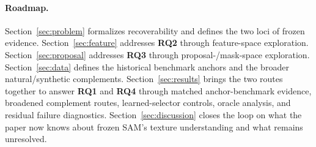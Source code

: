 \paragraph{Roadmap.} Section~\ref{sec:problem} formalizes recoverability and defines the two loci of frozen evidence. Section~\ref{sec:feature} addresses \textbf{RQ2} through feature-space exploration. Section~\ref{sec:proposal} addresses \textbf{RQ3} through proposal-/mask-space exploration. Section~\ref{sec:data} defines the historical benchmark anchors and the broader natural/synthetic complements. Section~\ref{sec:results} brings the two routes together to answer \textbf{RQ1} and \textbf{RQ4} through matched anchor-benchmark evidence, broadened complement routes, learned-selector controls, oracle analysis, and residual failure diagnostics. Section~\ref{sec:discussion} closes the loop on what the paper now knows about frozen SAM's texture understanding and what remains unresolved.
